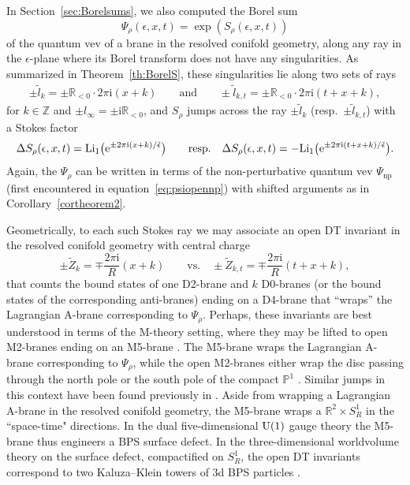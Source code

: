 \documentclass[pdftex]{sigma}
\numberwithin{equation}{section}
\begin{document}
In Section~\ref{sec:Borelsums}, we also computed the Borel sum
\begin{equation*}
 \Psi_\rho(\epsilon,x,t) = \exp ( S_\rho(\epsilon,x,t) )
\end{equation*}
of the quantum vev of a brane in the resolved conifold geometry, along any ray in the $\epsilon$-plane where its Borel transform does not have any singularities. As summarized in Theorem~\ref{th:BorelS}, these singularities lie along two sets of rays
\begin{align*}
\pm \widetilde{l}_k =\pm \mathbb{R}_{< 0} \cdot 2 \pi \mathrm{i} (x+k) \qquad \mathrm{and} \qquad
\pm \widetilde{l}_{k,t} = \pm \mathbb{R}_{< 0} \cdot 2 \pi \mathrm{i} (t+x+k),
\end{align*}
for $k \in \mathbb{Z}$ and $\pm l_\infty = \pm \mathrm{i} \mathbb{R}_{<0}$, and $S_\rho$ jumps across the ray $\pm \widetilde{l}_k$ (resp.~$\pm \widetilde{l}_{k,t}$) with a Stokes factor
\begin{align*}
\Delta S_{\rho}(\epsilon,x,t) = \mathrm{Li}_1 \big( {\rm e}^{\pm 2\pi \mathrm{i}(x+k)/\check\epsilon} \big) \qquad \mathrm{resp.} \quad \Delta S_{\rho}(\epsilon,x,t) = - \mathrm{Li}_1 \big( {\rm e}^{\pm 2\pi \mathrm{i}(t+x+k)/\check \epsilon} \big).
\end{align*}
Again, the $\Psi_\rho$ can be written in terms of the non-perturbative quantum vev $\Psi_\mathrm{np}$ (first encountered in equation~\eqref{eq:psiopennp}) with shifted arguments as in Corollary~\ref{cortheorem2}.

Geometrically, to each such Stokes ray we may associate an open DT invariant in the resolved conifold geometry with central charge
\begin{equation*}
\pm \widetilde{Z}_{k} = \mp \frac{2 \pi \mathrm{i}}{R} (x+k) \qquad \mathrm{vs.} \quad \pm \widetilde{Z}_{k,t} = \mp \frac{2 \pi \mathrm{i}}{R} (t+x+k),
\end{equation*}
that counts the bound states of one D2-brane and $k$ D0-branes (or the bound states of the corresponding anti-branes) ending on a D4-brane that ``wraps'' the Lagrangian A-brane corresponding to $\Psi_\rho$. Perhaps, these invariants are best understood in terms of the M-theory setting, where they may be lifted to open M2-branes ending on an M5-brane \cite{Ooguri:1999bv}. The M5-brane wraps the Lagrangian A-brane corresponding to $\Psi_\rho$, while the open M2-branes either wrap the disc passing through the north pole or the south pole of the compact $\mathbb{P}^1$ \cite{Aganagic:2000gs}. Similar jumps in this context have been found previously in \cite{Aganagic:2009cg}.
Aside from wrapping a Lagrangian A-brane in the resolved conifold geometry, the M5-brane wraps a $\mathbb{R}^2 \times S^1_R$ in the ``space-time" directions. In the dual five-dimensional ${\rm U}(1)$ gauge theory the M5-brane thus engineers a BPS surface defect. In the three-dimensional worldvolume theory on the surface defect, compactified on $S^1_R$, the open DT invariants correspond to two Kaluza--Klein towers of 3d BPS particles \cite{Dimofte:2010tz}.
\end{document}
